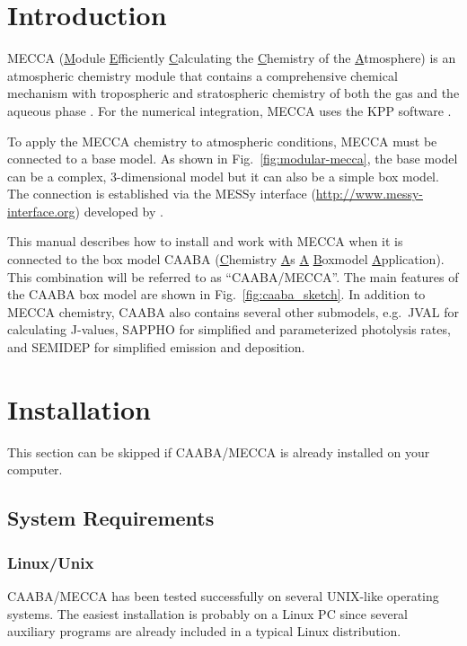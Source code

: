 \documentclass[twoside]{article}
\newcommand{\egcite}[1]{\citep[e.g.][]{#1}}
\begin{document}
\section{Introduction}

MECCA (\underline{M}odule \underline{E}fficiently
\underline{C}alculating the \underline{C}hemistry of the
\underline{A}tmosphere) is an atmospheric chemistry module that contains
a comprehensive chemical mechanism with tropospheric and stratospheric
chemistry of both the gas and the aqueous phase \citep{1666,2405}. For
the numerical integration, MECCA uses the KPP software \citep{1665}.

To apply the MECCA chemistry to atmospheric conditions, MECCA must be
connected to a base model. As shown in Fig.~\ref{fig:modular-mecca}, the
base model can be a complex, 3-dimensional model \egcite{1851} but it
can also be a simple box model. The connection is established via the
MESSy interface (\url{http://www.messy-interface.org}) developed by
\citet{1664}.

This manual describes how to install and work with MECCA when it is
connected to the box model CAABA (\underline{C}hemistry \underline{A}s
\underline{A} \underline{B}oxmodel \underline{A}pplication). This
combination will be referred to as ``CAABA/MECCA''. The main features of
the CAABA box model are shown in Fig.~\ref{fig:caaba_sketch}. In
addition to MECCA chemistry, CAABA also contains several other
submodels, e.g.\ JVAL for calculating J-values, SAPPHO for simplified
and parameterized photolysis rates, and SEMIDEP for simplified emission
and deposition.

\section{Installation}
\label{sec:install}

This section can be skipped if CAABA/MECCA is already installed on your
computer.

\subsection{System Requirements}

\subsubsection{Linux/Unix}

CAABA/MECCA has been tested successfully on several UNIX-like operating
systems. The easiest installation is probably on a Linux PC since
several auxiliary programs are already included in a typical Linux
distribution. 
\end{document}
